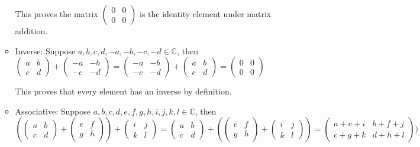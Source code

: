 \begin{enumerate}[(a)]
\begin{itemize}
	This proves the matrix 
	$\begin{pmatrix}
	0 & 0 \\ 
	0 & 0 \end{pmatrix}$ 
	is the identity element under matrix addition.

	\item
	Inverse: Suppose $a, b, c, d, -a, -b, -c, -d \in {\mathbb C}$, then 
	\\
	$\begin{pmatrix}
	a & b \\
	c & d
	\end{pmatrix} + 
	\begin{pmatrix}
	-a & -b \\
	-c & -d
	\end{pmatrix} = \begin{pmatrix}
	-a & -b \\
	-c & -d
	\end{pmatrix}+ 
	\begin{pmatrix}
	a & b \\
	c & d
	\end{pmatrix}  = \begin{pmatrix}
	0 & 0 \\
	0 & 0
	\end{pmatrix}$
	
	This proves that every element has an inverse by definition.

	\item
	
	Associative: Suppose $a, b, c, d, e, f, g, h, i, j, k, l \in {\mathbb C}$, then 
	\\
	$(\begin{pmatrix}
	a & b \\
	c & d
	\end{pmatrix} + 
	\begin{pmatrix}
	e & f \\
	g & h
	\end{pmatrix}) + 
	\begin{pmatrix}
	i & j \\
	k & l
	\end{pmatrix} = 
	\begin{pmatrix}
	a & b \\
	c & d
	\end{pmatrix} + 
	(\begin{pmatrix}
	e & f \\
	g & h
	\end{pmatrix} + 
	\begin{pmatrix}
	i & j \\
	k & l
	\end{pmatrix}) = 
	\begin{pmatrix}
	a + e + i & b + f + j \\
	c + g + k & d + h + l
	\end{pmatrix})$
	

\end{itemize}
\end{enumerate}
